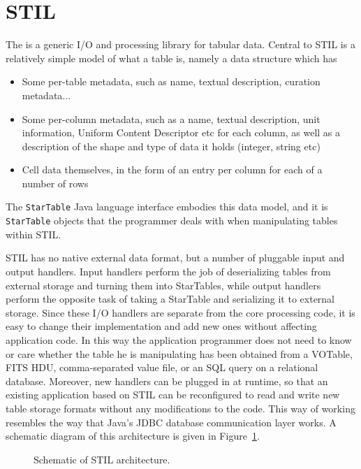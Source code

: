 \documentclass[11pt,twoside]{article}  %
\begin{document}
\section{STIL}

The  
is a generic I/O
and processing library for tabular data.
Central to STIL is a relatively simple model of what a table is, namely
a data structure which has
\begin{itemize}
\item Some per-table metadata, 
      such as name, textual description, curation metadata...
\item Some per-column metadata,
      such as a name, textual description, unit information, 
      Uniform Content Descriptor etc for each column, as well as 
      a description of the shape and type of data it holds 
      (integer, string etc)
\item Cell data themselves, in the form of an entry per column 
      for each of a number of rows
\end{itemize}
The {\tt StarTable} Java language interface embodies this data model,
and it is {\tt StarTable} objects that the programmer deals with
when manipulating tables within STIL.

STIL has no native external data format, but a number of pluggable
input and output handlers.  Input handlers perform the job of 
deserializing tables from external storage and turning them into 
StarTables, while output handlers perform the opposite task of taking
a StarTable and serializing it to external storage.
Since these I/O handlers are separate from the core processing code,
it is easy to change their implementation and add new ones 
without affecting application code.
In this way the application programmer does not need to know or
care whether the table he is manipulating has been obtained from
a VOTable, FITS HDU, comma-separated value file, or an SQL query
on a relational database.  Moreover, new handlers can be plugged
in at runtime, so that an existing application based on STIL can 
be reconfigured to read and write new table storage 
formats without any modifications to the code.
This way of working
resembles the way that Java's JDBC database communication layer works.
A schematic diagram of this architecture is given in Figure~\ref{FM3-fig-1}.
\begin{figure}
\caption{Schematic of STIL architecture.} \label{FM3-fig-1}
\end{figure}
\end{document}
